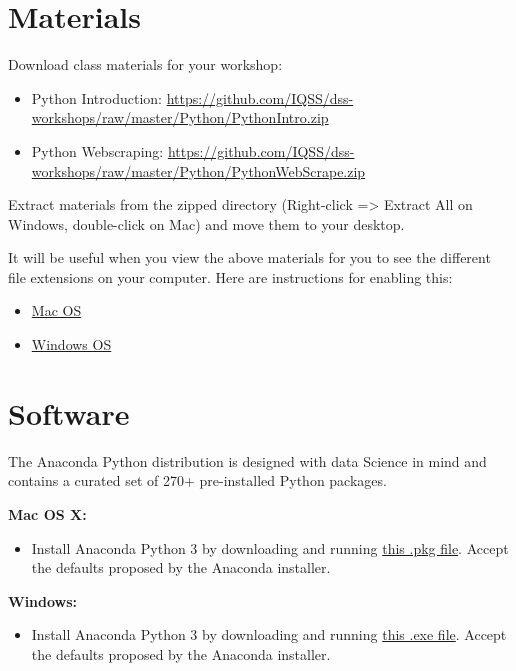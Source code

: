 \documentclass[
]{book}
\providecommand{\tightlist}{%
  \setlength{\itemsep}{0pt}\setlength{\parskip}{0pt}}
\begin{document}
\hypertarget{materials-1}{%
\section{Materials}\label{materials-1}}

Download class materials for your workshop:

\begin{itemize}
\tightlist
\item
  Python Introduction: \url{https://github.com/IQSS/dss-workshops/raw/master/Python/PythonIntro.zip}
\item
  Python Webscraping: \url{https://github.com/IQSS/dss-workshops/raw/master/Python/PythonWebScrape.zip}
\end{itemize}

Extract materials from the zipped directory (Right-click =\textgreater{} Extract All on Windows, double-click on Mac) and move them to your desktop.

It will be useful when you view the above materials for you to see the different file extensions on your computer. Here are instructions for enabling this:

\begin{itemize}
\tightlist
\item
  \href{https://support.apple.com/guide/mac-help/show-or-hide-filename-extensions-on-mac-mchlp2304/mac}{Mac OS}
\item
  \href{http://kb.winzip.com/kb/entry/26/}{Windows OS}
\end{itemize}

\hypertarget{software-1}{%
\section{Software}\label{software-1}}

The Anaconda Python distribution is designed with data Science in mind and contains a curated set of 270+ pre-installed Python packages.

\textbf{Mac OS X:}

\begin{itemize}
\tightlist
\item
  Install Anaconda Python 3 by downloading and running \href{https://repo.anaconda.com/archive/Anaconda3-2019.10-MacOSX-x86_64.pkg}{this .pkg file}. Accept the defaults proposed by the Anaconda installer.
\end{itemize}

\textbf{Windows:}

\begin{itemize}
\tightlist
\item
  Install Anaconda Python 3 by downloading and running \href{https://repo.anaconda.com/archive/Anaconda3-2019.10-Windows-x86_64.exe}{this .exe file}. Accept the defaults proposed by the Anaconda installer.
\end{itemize}
\end{document}

